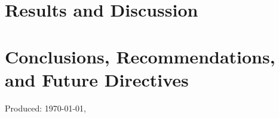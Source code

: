 \ifResultDiscuss 
	\chapter{Results and Discussion} 
	\label{ch:result_discuss} 
	\startcontents[chapters]
	\begin{SingleSpace}	
		\Mprintcontents 
	\end{SingleSpace}
	
	\stopcontents[chapters]
	\cleardoublepage
\fi

\ifConc
	\chapter{Conclusions, Recommendations, and Future Directives} 
	\label{ch:conc} 
	\startcontents[chapters]
	\begin{SingleSpace}	
		\Mprintcontents 
	\end{SingleSpace}
	
	\stopcontents[chapters]
	\cleardoublepage
\fi

\renewcommand{\UrlFont}{\normalfont}
\begin{SingleSpace}
  {\small }
%		
%		
%		
%	

\end{SingleSpace}
\vfill
\begin{flushright}
Produced: \usdate\today, \currenttime \\
\end{flushright}
\cleardoublepage 

